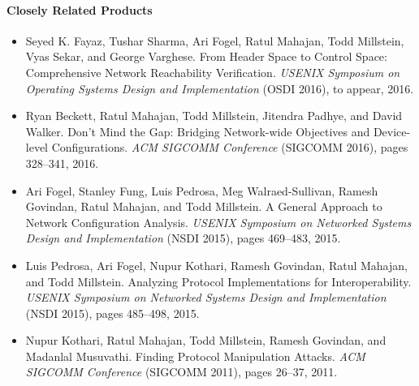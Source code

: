 \documentclass[11pt]{article}
\begin{document}
\paragraph{Closely Related Products}
\begin{itemize}

\item Seyed K. Fayaz,
              Tushar Sharma,
              Ari Fogel,
              Ratul Mahajan,
              Todd Millstein,
              Vyas Sekar, and
              George Varghese.  From Header Space to Control Space: Comprehensive Network Reachability Verification.  {\em USENIX Symposium on Operating Systems Design and Implementation} (OSDI 2016), to appear, 2016.

\item Ryan Beckett, Ratul Mahajan, Todd Millstein, Jitendra Padhye, and David Walker.  Don't Mind the Gap: Bridging Network-wide Objectives and Device-level Configurations.  {\em ACM SIGCOMM Conference} (SIGCOMM 2016), pages 328--341, 2016.

\item Ari Fogel, Stanley Fung, Luis Pedrosa, Meg Walraed-Sullivan, Ramesh Govindan, Ratul Mahajan, and Todd Millstein.  A General Approach to Network Configuration Analysis.  {\em USENIX Symposium on Networked Systems Design and Implementation} (NSDI 2015), pages 469--483, 2015.

\item Luis Pedrosa, Ari Fogel, Nupur Kothari, Ramesh Govindan, Ratul Mahajan, and 
Todd Millstein.  Analyzing Protocol Implementations for Interoperability.  {\em USENIX Symposium on Networked Systems Design and Implementation} (NSDI 2015), pages 485--498, 2015.

\item Nupur Kothari, Ratul Mahajan, Todd Millstein, Ramesh Govindan, and Madanlal Musuvathi.  Finding Protocol Manipulation Attacks.  {\em ACM SIGCOMM Conference} (SIGCOMM 2011), pages 26--37, 2011.

\end{itemize}
\end{document}
